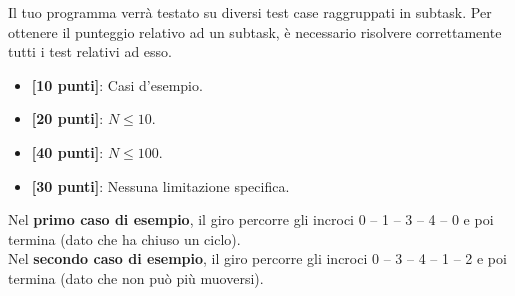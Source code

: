 \Scoring
Il tuo programma verrà testato su diversi test case raggruppati in subtask.
Per ottenere il punteggio relativo ad un subtask, è necessario risolvere
correttamente tutti i test relativi ad esso.

\begin{itemize}[nolistsep,itemsep=2mm]
  \item \textbf{ [10 punti]}: Casi d'esempio.
  \item \textbf{ [20 punti]}: $N \leq 10$.
  \item \textbf{ [40 punti]}: $N \leq 100$.
  \item \textbf{ [30 punti]}: Nessuna limitazione specifica.
\end{itemize}



\Examples
\begin{example}
%
%
\end{example}


\Explanation
Nel \textbf{primo caso di esempio}, il giro percorre gli incroci 0 -- 1 -- 3 -- 4 -- 0 e poi termina (dato che ha chiuso un ciclo).\\[2mm]
Nel \textbf{secondo caso di esempio}, il giro percorre gli incroci 0 -- 3 -- 4 -- 1 -- 2 e poi termina (dato che non può più muoversi).
